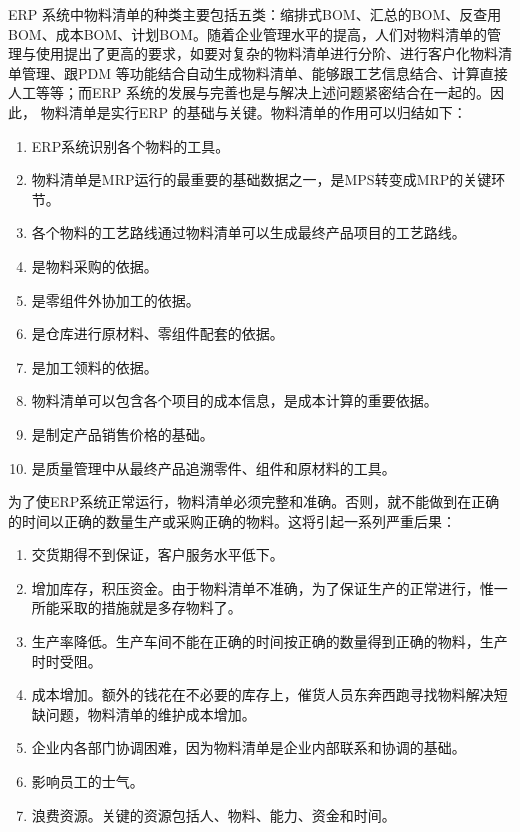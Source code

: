     ERP 系统中物料清单的种类主要包括五类：缩排式BOM、汇总的BOM、反查用BOM、成本BOM、计划BOM。随着企业管理水平的提高，人们对物料清单的管理与使用提出了更高的要求，如要对复杂的物料清单进行分阶、进行客户化物料清单管理、跟PDM 等功能结合自动生成物料清单、能够跟工艺信息结合、计算直接人工等等；而ERP 系统的发展与完善也是与解决上述问题紧密结合在一起的。因此， 物料清单是实行ERP 的基础与关键。物料清单的作用可以归结如下：

    \begin{enumerate}
        \item  ERP系统识别各个物料的工具。
        \item  物料清单是MRP运行的最重要的基础数据之一，是MPS转变成MRP的关键环节。
        \item  各个物料的工艺路线通过物料清单可以生成最终产品项目的工艺路线。
        \item  是物料采购的依据。
        \item  是零组件外协加工的依据。
        \item  是仓库进行原材料、零组件配套的依据。
        \item  是加工领料的依据。
        \item  物料清单可以包含各个项目的成本信息，是成本计算的重要依据。
        \item  是制定产品销售价格的基础。
        \item  是质量管理中从最终产品追溯零件、组件和原材料的工具。
    \end{enumerate}

    为了使ERP系统正常运行，物料清单必须完整和准确。否则，就不能做到在正确的时间以正确的数量生产或采购正确的物料。这将引起一系列严重后果：

    \begin{enumerate}
        \item  交货期得不到保证，客户服务水平低下。
        \item  增加库存，积压资金。由于物料清单不准确，为了保证生产的正常进行，惟一所能采取的措施就是多存物料了。
        \item  生产率降低。生产车间不能在正确的时间按正确的数量得到正确的物料，生产时时受阻。
        \item  成本增加。额外的钱花在不必要的库存上，催货人员东奔西跑寻找物料解决短缺问题，物料清单的维护成本增加。
        \item  企业内各部门协调困难，因为物料清单是企业内部联系和协调的基础。
        \item  影响员工的士气。
        \item   浪费资源。关键的资源包括人、物料、能力、资金和时间。
    \end{enumerate}


